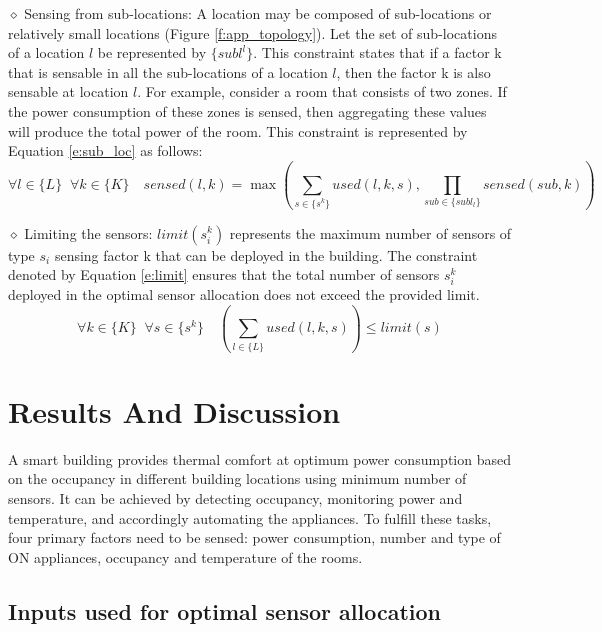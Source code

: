 \documentclass[]{interact}
\theoremstyle{plain}%
\theoremstyle{definition}
\theoremstyle{remark}
\begin{document}
  \noindent $\diamond$ Sensing from sub-locations: A location may be composed of sub-locations or relatively small locations (Figure \ref{f:app_topology}). Let the set of sub-locations of a location $l$ be represented by $\{subl^l\}$. This constraint states that if a factor k that is sensable in all the sub-locations of a location $l$, then the factor k is also sensable at location $l$. For example, consider a room that consists of two zones. 
  If the power consumption of these zones is sensed, then aggregating these values will produce the total power of the room.
  This constraint is represented by Equation \eqref{e:sub_loc} as follows:
\begin{equation}
    \label{e:sub_loc}
    \forall l \in \{L\} \;\; \forall k \in \{K\} \quad sensed(l,k) = \max \left(
  \sum_{s \in \{s^k\}}  used(l,k,s) , 
  \prod_{sub \in \{subl_l\}} sensed(sub,k)
  \right)
  \end{equation}

  \noindent $\diamond$ Limiting the sensors: $limit(s_i^k)$ represents the maximum number of sensors of type $s_i$ sensing factor k that can be deployed in the building.
  The constraint denoted by Equation \eqref{e:limit} ensures that the total number of sensors $s_i^k$ deployed in the optimal sensor allocation does not exceed the provided limit.
\begin{equation}
  \label{e:limit}
    \forall k \in \{K\} \;\; \forall s \in \{s^k\} \quad \left(
      \sum_{l \in \{L\}} used(l,k,s)
    \right) \leq limit(s)
   \end{equation}


\section{Results And Discussion}

A smart building provides thermal comfort at optimum power consumption based on the occupancy in different building locations using minimum number of sensors. 
It can be achieved by detecting occupancy, monitoring power and temperature, and accordingly automating the appliances.
To fulfill these tasks, four primary factors need to be sensed: power consumption, number and type of ON appliances, occupancy and temperature of the rooms.

\subsection{Inputs used for optimal sensor allocation}
\end{document}
